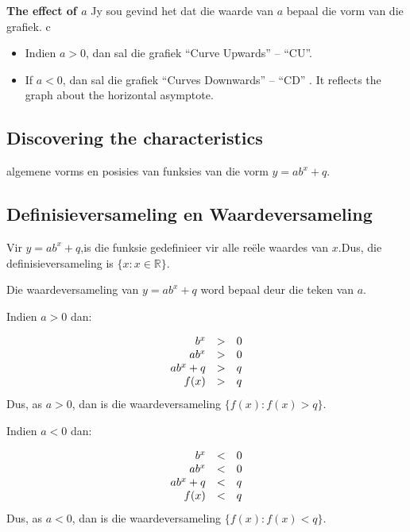 \textbf{The effect of $a$}\newline
Jy sou gevind het dat die waarde van $a$ bepaal die vorm van die grafiek. c
\begin{itemize}
 \item Indien $a>0$, dan sal die grafiek “Curve Upwards” – “CU”.
\item If $a<0$, dan sal die grafiek “Curves Downwards” – “CD” . It reflects the graph about the horizontal asymptote.
\end{itemize}

\subsection*{Discovering the characteristics}
algemene vorms en posisies van funksies van die vorm $y=ab^{x} + q$.
\subsection*{Definisieversameling en Waardeversameling}

Vir $y=ab^{x}+q$,is die funksie gedefinieer vir alle reële waardes van $x$.Dus, die definisieversameling is $\{x:x\in \mathbb{R}\}$.\par 
Die waardeversameling van $y=ab^{x}+q$ word bepaal deur die teken van $a$.\par 
Indien $a>0$ dan:\par
\begin{equation*}
\begin{array}{ccc}\hfill b^{x}& > & 0\hfill \\
 \hfill ab^{x}& > & 0\hfill \\ 
\hfill ab^{x}+q& > & q\hfill \\ 
\hfill f(x)& > & q\hfill 
\end{array}
\end{equation*}
Dus, as  $a>0$, dan is die waardeversameling  $\{f(x):f(x) > q\}$.\par 
Indien $a<0$ dan:\par 

\begin{equation*}
\begin{array}{ccc}\hfill b^{x}&< & 0\hfill \\
 \hfill ab^{x}& < & 0\hfill \\
\hfill ab^{x}+q& < & q\hfill \\
 \hfill f(x)& < & q\hfill 
\end{array}
\end{equation*}
Dus, as $a<0$, dan is die waardeversameling  $\{f(x):f(x) < q\}$.\par 

